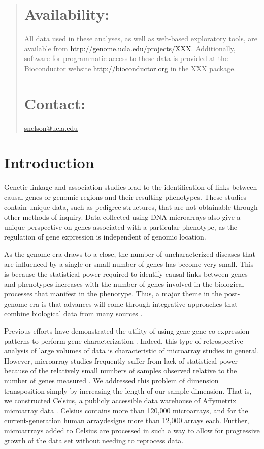 \documentclass{bioinfo}
\begin{document}
\begin{abstract}
\section{Availability:}
All data used in these analyses, as well as web-based exploratory tools, are
available from \url{http://genome.ucla.edu/projects/XXX}.  Additionally,
software for programmatic access to these data is provided at the Bioconductor
website \url{http://bioconductor.org} in the XXX package.

\section{Contact:} \href{snelson@ucla.edu}{snelson@ucla.edu}
\end{abstract}

\section{Introduction}

Genetic linkage and association studies lead to the identification of links
between causal genes or genomic regions and their resulting phenotypes.  These
studies contain unique data, such as pedigree structures, that are not
obtainable through other methods of inquiry.  Data collected using DNA
microarrays also give a unique perspective on genes associated with a
particular phenotype, as the regulation of gene expression is independent of
genomic location.

As the genome era draws to a close, the number of uncharacterized diseases that
are influenced by a single or small number of genes has become very small.
This is because the statistical power required to identify causal links between
genes and phenotypes increases with the number of genes involved in the
biological processes that manifest in the phenotype.  Thus, a major theme in
the post-genome era is that advances will come through integrative approaches
that combine biological data from many sources \cite{liver, operon, csbdb,
wormnet}.

Previous efforts have demonstrated the utility of using gene-gene co-expression
patterns to perform gene characterization \cite{kim, sp, webtom, carlson, aspm,
agca}.  Indeed, this type of retrospective analysis of large volumes of data is
characteristic of microarray studies in general.  However, microarray studies
frequently suffer from lack of statistical power because of the relatively
small numbers of samples observed relative to the number of genes measured
\cite{dimensionality}.  We addressed this problem of dimension transposition
simply by increasing the length of our sample dimension.  That is, we
constructed Celsius, a publicly accessible data warehouse of Affymetrix
microarray data \cite{celsius}.  Celsius contains more than 120,000
microarrays, and for the current-generation human arraydesigns more than 12,000
arrays each.  Further, microarrrays added to Celsius are processed in such a
way to allow for progressive growth of the data set without needing to
reprocess data.
\end{document}
